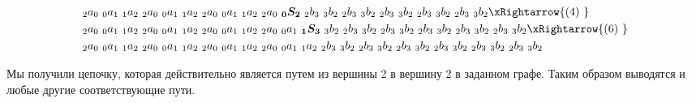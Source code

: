 \begin{example}
\begin{align*}
        & {_2a_0}\ {_0a_1}\ {_1a_2}\ {_2a_0}\ {_0a_1}\ {_1a_2}\ {_2a_0}\ {_0a_1}\ {_1a_2}\ {_2a_0}\ \boldsymbol{_0S_2}\ {_2b_3}\ {_3b_2}\ {_2b_3}\ {_3b_2}\ {_2b_3}\ {_3b_2}\ {_2b_3}\ {_3b_2}\ {_2b_3}\ {_3b_2} \xRightarrow{(4)\ } \\
        & {_2a_0}\ {_0a_1}\ {_1a_2}\ {_2a_0}\ {_0a_1}\ {_1a_2}\ {_2a_0}\ {_0a_1}\ {_1a_2}\ {_2a_0}\ {_0a_1}\ \boldsymbol{_1S_3}\ {_3b_2}\ {_2b_3}\ {_3b_2}\ {_2b_3}\ {_3b_2}\ {_2b_3}\ {_3b_2}\ {_2b_3}\ {_3b_2}\ {_2b_3}\ {_3b_2} \xRightarrow{(6)\ } \\
        & {_2a_0}\ {_0a_1}\ {_1a_2}\ {_2a_0}\ {_0a_1}\ {_1a_2}\ {_2a_0}\ {_0a_1}\ {_1a_2}\ {_2a_0}\ {_0a_1}\ {_1a_2}\ {_2b_3}\ {_3b_2}\ {_2b_3}\ {_3b_2}\ {_2b_3}\ {_3b_2}\ {_2b_3}\ {_3b_2}\ {_2b_3}\ {_3b_2}\ {_2b_3}\ {_3b_2}
    \end{align*}

    Мы получили цепочку, которая действительно является путем из вершины 2 в вершину 2 в заданном графе. Таким образом выводятся и любые другие соответствующие пути.

\end{example}


